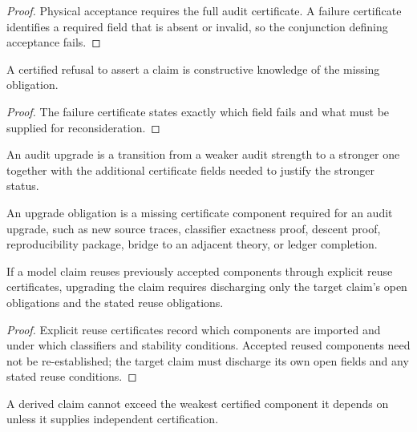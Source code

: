 \begin{proof}
Physical acceptance requires the full audit certificate. A failure certificate identifies a required field that is absent or invalid, so the conjunction defining acceptance fails.
\end{proof}

\begin{corollary}
\label{cor:negative-knowledge-constructive-audit}
A certified refusal to assert a claim is constructive knowledge of the missing obligation.
\end{corollary}

\begin{proof}
The failure certificate states exactly which field fails and what must be supplied for reconsideration.
\end{proof}

\begin{definition}
\label{def:audit-upgrade}
An audit upgrade is a transition from a weaker audit strength to a stronger one together with the additional certificate fields needed to justify the stronger status.
\end{definition}

\begin{definition}
\label{def:upgrade-obligation}
An upgrade obligation is a missing certificate component required for an audit upgrade, such as new source traces, classifier exactness proof, descent proof, reproducibility package, bridge to an adjacent theory, or ledger completion.
\end{definition}

\begin{theorem}
\label{thm:audit-upgrades-local-explicit-reuse}
If a model claim reuses previously accepted components through explicit reuse certificates, upgrading the claim requires discharging only the target claim's open obligations and the stated reuse obligations.
\end{theorem}

\begin{proof}
Explicit reuse certificates record which components are imported and under which classifiers and stability conditions. Accepted reused components need not be re-established; the target claim must discharge its own open fields and any stated reuse conditions.
\end{proof}

\begin{corollary}
\label{cor:composite-strength-weakest-dependency}
A derived claim cannot exceed the weakest certified component it depends on unless it supplies independent certification.
\end{corollary}


